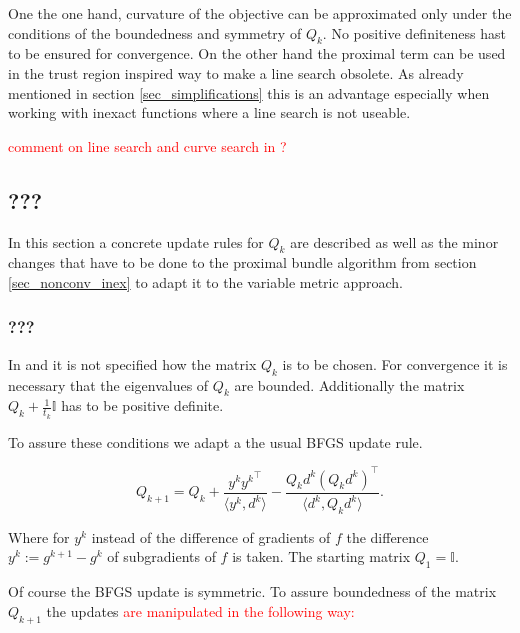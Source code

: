 One the one hand, curvature of the objective can be approximated only under the conditions of the boundedness and symmetry of \(Q_k\). No positive definiteness hast to be ensured for convergence.
On the other hand the proximal term can be used in the trust region inspired way to make a line search obsolete. As already mentioned in section \ref{sec_simplifications} this is an advantage especially when working with inexact functions where a line search is not useable.

\textcolor{red}{comment on line search and curve search in \cite{Lemarechal1994,Lemarechal1997,Vlcek2001}?}

\subsection{???}

In this section a concrete update rules for \(Q_k\) are described as well as the minor changes that have to be done to the proximal bundle algorithm from section \ref{sec_nonconv_inex} to adapt it to the variable metric approach.

\subsubsection{???}

In \cite{Noll2012} and \cite{Noll2013} it is not specified how the matrix \(Q_k\) is to be chosen.
For convergence it is necessary that the eigenvalues of \(Q_k\) are bounded. Additionally the matrix \(Q_k+\frac{1}{t_k}\mathbb{I}\) has to be positive definite.

To assure these conditions we adapt a the usual BFGS update rule.

\begin{equation*}
	Q_{k+1} = Q_k + \frac{y^k{y^k}^{\top}}{\langle y^k,d^k\rangle}-\frac{Q_kd^k(Q_kd^k)^{\top}}{\langle d^k,Q_kd^k \rangle}.
\end{equation*}

Where for \(y^k\) instead of the difference of gradients of \(f\) the difference \(y^k := g^{k+1}-g^k\) of subgradients of \(f\) is taken.
The starting matrix \(Q_1 = \mathbb{I}\).


Of course the BFGS update is symmetric. To assure boundedness of the matrix \(Q_{k+1}\) the updates 
\textcolor{red}{are manipulated in the following way:}

